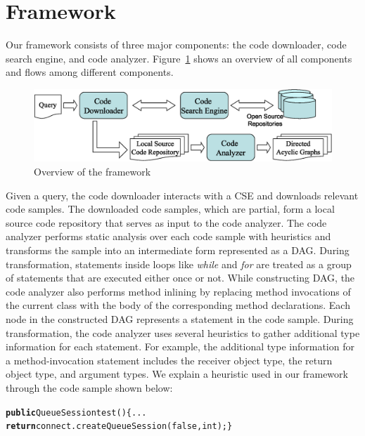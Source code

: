 
\section{Framework}
\label{sec:framework}

Our framework consists of three major components: the code downloader,
code search engine, and code analyzer. Figure~\ref{fig:architecture}
shows an overview of all components and flows among different components.

\begin{figure}[t]
\centering
\includegraphics[scale=0.36,clip]{Framework1.eps}
\caption{Overview of the framework} \label{fig:architecture}
\vspace*{-2ex}
\end{figure}

Given a query, the code downloader interacts with a CSE and downloads
relevant code samples. The downloaded code samples, which are partial, form a local
source code repository that serves as input to the code analyzer.
The code analyzer performs static analysis over each code sample with heuristics and
transforms the sample into an intermediate form represented as a DAG.
During transformation, statements inside loops like \emph{while} and \emph{for}
are treated as a group of statements that are executed either once or not.
While constructing DAG, the code analyzer also performs method inlining
by replacing method invocations of the current class with the
body of the corresponding method declarations. Each node in the constructed
DAG represents a statement in the code sample. During transformation,
the code analyzer uses several heuristics to gather additional type information
for each statement. For example, the additional type information for
a method-invocation statement includes the receiver object type, the
return object type, and argument types. We explain a heuristic
used in our framework through the code sample shown below:

\begin{CodeOut}
\begin{alltt}
\textbf{public} QueueSession test()\hspace*{0.2in}\{ ...
\hspace*{0.4in}\textbf{return} connect.createQueueSession(false,int);\}
\end{alltt}
\end{CodeOut}
\vspace*{-1ex}

